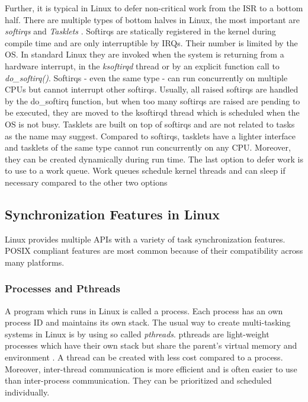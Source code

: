 Further, it is typical in Linux to defer non-critical work from the \ac{ISR} to a bottom half.
There are multiple types of bottom halves in Linux, the most important are \textit{softirqs} and \textit{Tasklets} \cite{love:lkd}.
Softirqs are statically registered in the kernel during compile time and are only interruptible by \acp{IRQ}.
Their number is limited by the \ac{OS}.
In standard Linux they are invoked when the system is returning from a hardware interrupt, in the \textit{ksoftirqd} thread or by an explicit function call to \textit{do\_softirq()}.
Softirqs - even the same type - can run concurrently on multiple \acp{CPU} but cannot interrupt other softirqs.
Usually, all raised softirqs are handled by the do\_softirq function, but when too many softirqs are raised are pending to be executed, they are moved to the ksoftirqd thread which is scheduled when the \ac{OS} is not busy.
Tasklets are built on top of softirqs and are not related to tasks as the name may suggest. 
Compared to softirqs, tasklets have a lighter interface and tasklets of the same type cannot run concurrently on any \ac{CPU}.
Moreover, they can be created dynamically during run time.
The last option to defer work is to use to a work queue.
Work queues schedule kernel threads and can sleep if necessary compared to the other two options

\subsection{Synchronization Features in Linux}\label{ss_sync_features_in_linux}
Linux provides multiple \acp{API} with a variety of task synchronization features. 
\ac{POSIX} compliant features are most common because of their compatibility across many platforms.
\subsubsection{Processes and Pthreads}\label{sss_processes_and_pthreads}
A program which runs in Linux is called a process. 
Each process has an own process ID and maintains its own stack. 
The usual way to create multi-tasking systems in Linux is by using so called \textit{pthreads}.
pthreads are light-weight processes which have their own stack but share the parent's virtual memory and environment \cite{barney:pthreads}.
A thread can be created with less cost compared to a process.
Moreover, inter-thread communication is more efficient and is often easier to use than inter-process communication.
They can be prioritized and scheduled individually. 
